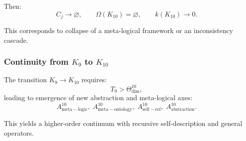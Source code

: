 Then:
\[
  C_j \to \varnothing,\qquad
  \Omega(K_{10})=\varnothing,\qquad
  k(K_{10})\to 0.
\]

This corresponds to collapse of a meta-logical framework or an
inconsistency cascade.


\subsubsection{Continuity from \texorpdfstring{$K_9$}{K_9} to $K_{10}$}

The transition $K_9\to K_{10}$ requires:
\[
  T_9 > \Theta^{10}_{\mathrm{dim}},
\]
leading to emergence of new abstraction and meta-logical axes:
\[
  A^{10}_{\mathrm{meta\!-\!logic}},\;
  A^{10}_{\mathrm{meta\!-\!ontology}},\;
  A^{10}_{\mathrm{self\!-\!ref}},\;
  A^{10}_{\mathrm{abstraction}}.
\]

This yields a higher-order continuum with recursive self-description and
general operators.

